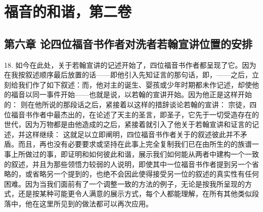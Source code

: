 

\section{福音的和谐，第二卷}


\subsection{第六章 论四位福音书作者对洗者若翰宣讲位置的安排}

18. 如今在此处，关于若翰宣讲的记述开始了，四位福音书作者都呈现了它。因为在我按叙述顺序最后放置的话——即他引入先知证言的那句话，即，——之后，立刻给我们作了如下叙述：而，他对主的诞生、婴孩或少年时期都未作记述，却使他的福音以同一事件开始——也就是说，以若翰的宣讲开始。因为他正是这样开始的： 则在他所说的那段话之后，紧接着以这样的措辞谈论若翰的宣讲： 宗徒，四位福音书作者中最杰出的，在论述了天主的圣言，即圣子，它先于一切受造存在的世代，因为万物都是由他造成的之后，紧接着就引入了他关于若翰宣讲和证言的记述，并这样继续： 这就足以立即阐明，四位福音书作者关于的叙述彼此并不矛盾。而且，再也没有必要要求或坚持在此事上完全复制我们已在由所生的的族谱一事上所做过的事，即证明和如何彼此和谐，展示我们如何能从两者中建构一个一致的叙述，并且为那些领悟力较弱的人说明，即使其中一位福音书作者提到另一个省略的，或省略另一个提到的，也绝不会因此使得接受另一位的叙述的真实性有任何困难。因为当我们面前有了一个调整一致的方法的例子，无论是按我所呈现的方式，还是按某种可能更令人满意的展示方式，每个人都能理解，在所有其他类似段落中，他在这里所见到的做法都可以再次应用。\par

